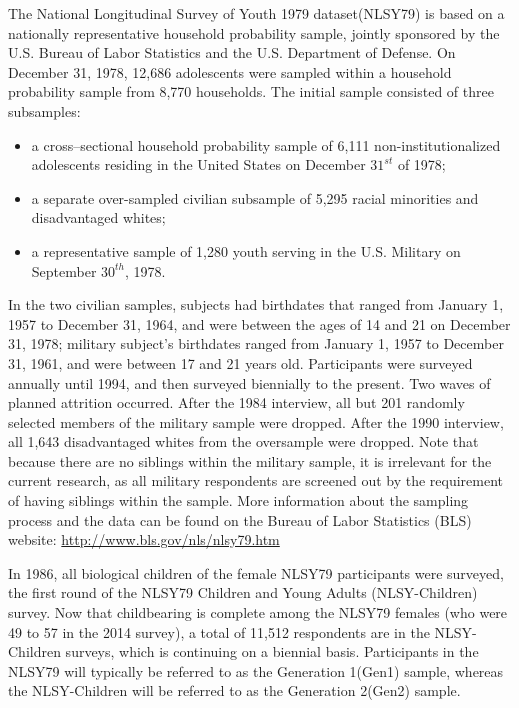 The National Longitudinal Survey of Youth 1979 dataset(NLSY79) is based on a nationally representative household probability sample, jointly sponsored by the U.S. Bureau of Labor Statistics and the U.S. Department of Defense. On December 31, 1978, 12,686 adolescents were sampled within a household probability sample from 8,770 households. The initial sample consisted of three subsamples: \begin{itemize}\item a cross--sectional household probability sample of 6,111 non-institutionalized adolescents residing in the United States on December $31^{st}$ of 1978; \item a separate over-sampled civilian subsample of 5,295 racial minorities and disadvantaged whites; \item a representative sample of 1,280 youth serving in the U.S. Military on September $30^{th}$, 1978.\end{itemize} In the two civilian samples, subjects had birthdates that ranged from January 1, 1957 to December 31, 1964, and were between the ages of 14 and 21 on December 31, 1978; military subject's birthdates ranged from January 1, 1957 to December 31, 1961, and were between 17 and 21 years old. Participants were surveyed annually until 1994, and then surveyed biennially to the present. Two waves of planned attrition occurred. After the 1984 interview, all but 201 randomly selected members of the military sample were dropped. After the 1990 interview, all 1,643 disadvantaged whites from the oversample were dropped. Note that because there are no siblings within the military sample, it is irrelevant for the current research, as all military respondents are screened out by the requirement of having siblings within the sample. More information about the sampling process and the data can be found on the Bureau of Labor Statistics (BLS) website: \url{http://www.bls.gov/nls/nlsy79.htm}

In 1986, all biological children of the female NLSY79 participants were surveyed, the first round of the NLSY79 Children and Young Adults (NLSY-Children) survey. Now that childbearing is complete among the NLSY79 females (who were 49 to 57 in the 2014 survey), a total of 11,512 respondents are in the NLSY-Children surveys, which is continuing on a biennial basis. Participants in the NLSY79 will typically be referred to as the Generation 1(Gen1) sample, whereas the NLSY-Children will be referred to as the Generation 2(Gen2) sample.
